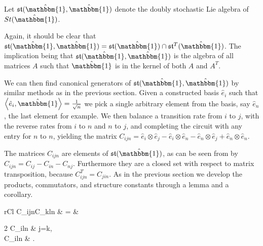 \begin{definition}
	Let $\mathfrak{st}(\hat{\mathbbm{1}}, \hat{\mathbbm{1}})$ denote the doubly 
	stochastic Lie algebra of $St(\hat{\mathbbm{1}})$.
\end{definition}

Again, it should be clear that $\mathfrak{st}(\hat{\mathbbm{1}}, \hat{\mathbbm{1}}) = \mathfrak{st}(\hat{\mathbbm{1}}) \cap \mathfrak{st}^T(\hat{\mathbbm{1}})$.
The implication being that $\mathfrak{st}(\hat{\mathbbm{1}}, \hat{\mathbbm{1}})$
is the algebra of all matrices $A$ such that $\hat{\mathbbm{1}}$ is in the 
kernel of both $A$ and $A^T$.

We can then find canonical generators of $\mathfrak{st}(\hat{\mathbbm{1}}, \hat{\mathbbm{1}})$
by similar methods as in the previous section. Given a constructed basis $\hat{e}_i$
such that $\left\langle \hat{e}_i, \hat{\mathbbm{1}} \right\rangle = \frac{1}{\sqrt{n}}$
we pick a single arbitrary element from the basis, say $\hat{e}_n$, the last
element for example. We then balance a transition rate from $i$ to $j$, with the
reverse rates from $i$ to $n$ and $n$ to $j$, and completing the circuit with
any entry for $n$ to $n$, yielding the matrix $C_{ijn} = \hat{e}_i \otimes \hat{e}_j - \hat{e}_i \otimes \hat{e}_n - \hat{e}_n \otimes \hat{e}_j + \hat{e}_n \otimes \hat{e}_n$.


The matrices $C_{ijn}$ are elements of $\mathfrak{st}(\hat{\mathbbm{1}})$, as 
can be seen from by $C_{ijn} = C_{ij} - C_{in} - C_{nj}$. Furthermore they are a
closed set with respect to matrix transposition, because $C_{ijn}^T = C_{jin}$.
As in the previous section we develop the products, commutators, and structure 
constants through a lemma and a corollary.

\begin{lemma}
	\begin{IEEEeqnarray*}{rCl}
		C_{ijn}C_{kln} & = &
		\begin{cases}
			2 C_{iln} & j=k,\\
			C_{iln} & .
		\end{cases}
	\end{IEEEeqnarray*}
\end{lemma}

